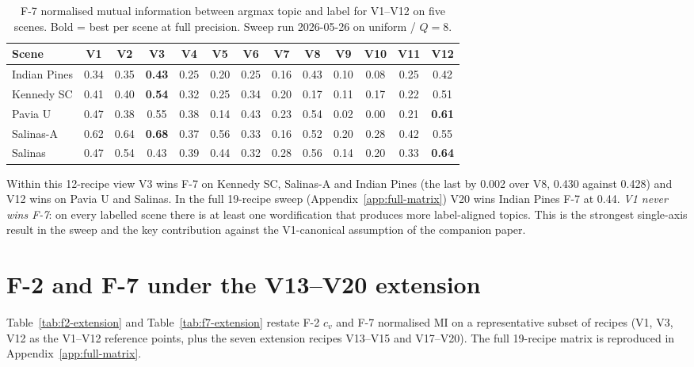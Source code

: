 \documentclass[journal,a4paper,10pt]{IEEEtran}
\begin{document}
\begin{table}[ht]
\caption{F-7 normalised mutual information between argmax topic and
label for V1--V12 on five scenes. Bold = best per scene at full
precision. Sweep run 2026-05-26 on uniform / $Q = 8$.}
\label{tab:f7-full}
\centering
\small
\begin{tabular}{lcccccccccccc}
\toprule
Scene & V1 & V2 & V3 & V4 & V5 & V6 & V7 & V8 & V9 & V10 & V11 & V12 \\
\midrule
Indian Pines     & 0.34 & 0.35 & \textbf{0.43} & 0.25 & 0.20 & 0.25 & 0.16 & 0.43 & 0.10 & 0.08 & 0.25 & 0.42 \\
Kennedy SC       & 0.41 & 0.40 & \textbf{0.54} & 0.32 & 0.25 & 0.34 & 0.20 & 0.17 & 0.11 & 0.17 & 0.22 & 0.51 \\
Pavia U          & 0.47 & 0.38 & 0.55 & 0.38 & 0.14 & 0.43 & 0.23 & 0.54 & 0.02 & 0.00 & 0.21 & \textbf{0.61} \\
Salinas-A        & 0.62 & 0.64 & \textbf{0.68} & 0.37 & 0.56 & 0.33 & 0.16 & 0.52 & 0.20 & 0.28 & 0.42 & 0.55 \\
Salinas          & 0.47 & 0.54 & 0.43 & 0.39 & 0.44 & 0.32 & 0.28 & 0.56 & 0.14 & 0.20 & 0.33 & \textbf{0.64} \\
\bottomrule
\end{tabular}
\end{table}

Within this 12-recipe view V3 wins F-7 on Kennedy SC, Salinas-A and
Indian Pines (the last by 0.002 over V8, 0.430 against 0.428) and V12
wins on Pavia U and Salinas. In the full 19-recipe sweep
(Appendix~\ref{app:full-matrix}) V20 wins Indian Pines F-7 at 0.44.
\emph{V1 never wins F-7}: on every labelled scene there is at least
one wordification that produces more label-aligned topics. This is
the strongest single-axis result in the sweep and the key
contribution against the V1-canonical assumption of the companion
paper.

\section{F-2 and F-7 under the V13--V20 extension}
\label{sec:f-extension-results}

Table~\ref{tab:f2-extension} and Table~\ref{tab:f7-extension} restate
F-2 $c_v$ and F-7 normalised MI on a representative subset of recipes
(V1, V3, V12 as the V1--V12 reference points, plus the seven extension
recipes V13--V15 and V17--V20). The full 19-recipe matrix
is reproduced in Appendix~\ref{app:full-matrix}.
\end{document}
